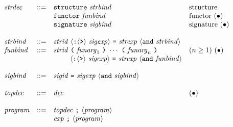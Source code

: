 \documentclass[twoside,titlepage]{article}
\newcommand{\void}[1]{}
\begin{document}
\begin{appendix}
  $$
  \begin{array}{llll}
  \mathit{strdec} & ::= & {\tt{structure}}~\mathit{strbind} & \textrm{structure} \\
  && {\tt{functor}}~\mathit{funbind} & \textrm{functor $(\bullet)$} \\
  && {\tt{signature}}~\mathit{sigbind} & \textrm{signature $(\bullet)$} \\
  \\
  \mathit{strbind} & ::= & \mathit{strid}~\langle\mbox{\tt:}\langle\mbox{\tt>}\rangle~\mathit{sigexp}\rangle~\mbox{\tt=}~\mathit{strexp}~\langle{\tt{and}}~\mathit{strbind}\rangle \\
  \mathit{funbind} & ::= & \mathit{strid}~\mbox{\tt(}~\mathit{funarg}_1~\mbox{\tt)}~\cdots~\mbox{\tt(}~\mathit{funarg}_n~\mbox{\tt)} & (n\geq1)~ (\bullet) \\
  && ~~~~~~~\langle\mbox{\tt:}\langle\mbox{\tt>}\rangle~\mathit{sigexp}\rangle~\mbox{\tt=}~\mathit{strexp}~\langle{\tt{and}}~\mathit{funbind}\rangle \\
  \\
  \mathit{sigbind} & ::= & \mathit{sigid}~\mbox{\tt=}~\mathit{sigexp}~\langle{\tt{and}}~\mathit{sigbind}\rangle \\
  \\
  \mathit{topdec} & ::= & \mathit{dec} & (\bullet) \\
  \\
  \mathit{program} &::=& \mathit{topdec}~\mbox{\tt;}~\langle\mathit{program}\rangle \\
  && \mathit{exp}~\mbox{\tt;}~\langle\mathit{program}\rangle
  \end{array}
  $$


\void{
\section{Library Extensions}
\label{libextensions}

\subsection{Library Module for Generic Functionals}
\label{lib-fn}

\subsubsection*{Changes to the Basis Library }

}
\end{appendix}
\end{document}

